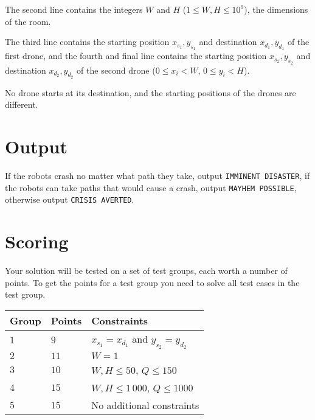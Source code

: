 The second line contains the integers $W$ and $H$ ($1 \le W, H \le 10^9$), the dimensions of the room.

The third line contains the starting position $x_{s_1}, y_{s_1}$ and destination $x_{d_1}, y_{d_1}$ of the first drone,
and the fourth and final line contains the starting position $x_{s_2}, y_{s_2}$ and destination $x_{d_2}, y_{d_2}$ of the second drone ($0 \le x_i < W$, $0 \le y_i < H$).

No drone starts at its destination, and the starting positions of the drones are different.

\section*{Output}
If the robots crash no matter what path they take, output \texttt{IMMINENT DISASTER},
if the robots can take paths that would cause a crash, output \texttt{MAYHEM POSSIBLE},
otherwise output \texttt{CRISIS AVERTED}.

\section*{Scoring}
Your solution will be tested on a set of test groups, each worth a number of points.
To get the points for a test group you need to solve all test cases in the test group.

\noindent
\begin{tabular}{| l | l | l |}
  \hline
  Group & Points & Constraints \\ \hline
  $1$    & $9$         &  $x_{s_1} = x_{d_1}$ and $y_{s_2} = y_{d_2}$ \\ \hline
  $2$    & $11$        &  $W = 1$ \\ \hline
  $3$    & $10$        &  $W, H \le 50$, $Q \le 150$ \\ \hline
  $4$    & $15$        &  $W, H \le 1\,000$, $Q \le 1000$ \\ \hline
  $5$    & $15$        &  No additional constraints \\ \hline
\end{tabular}
